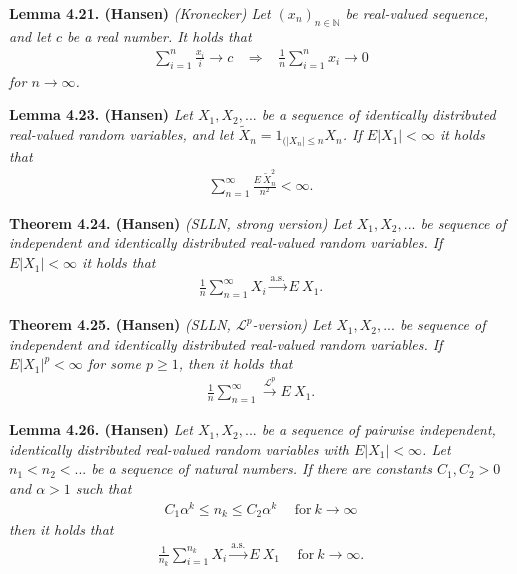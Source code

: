 \documentclass[a4paper,12pt,openany]{book}
\begin{document}
\textbf{Lemma 4.21. (Hansen)} \emph{(Kronecker) Let \((x_n)_{n\in\mathbb{N}}\) be real-valued sequence, and let \(c\) be a real number. It holds that}
\begin{align*}
    \sum_{i=1}^n\frac{x_i}{i}\to c \hspace{10pt}\Rightarrow\hspace{10pt} \frac{1}{n}\sum_{i=1}^nx_i\to 0
\end{align*}
\emph{for \(n\to \infty\).}

\textbf{Lemma 4.23. (Hansen)} \emph{Let \(X_1,X_2,...\) be a sequence of identically distributed real-valued random variables, and let \(\tilde{X}_n=1_{(\vert X_n\vert \le n}X_n\). If \(E\vert X_1\vert<\infty\) it holds that}
\begin{align*}
    \sum_{n=1}^\infty\frac{E\ \tilde{X}_n^2}{n^2}<\infty.
\end{align*}

\textbf{Theorem 4.24. (Hansen)} \emph{(SLLN, strong version) Let \(X_1,X_2,...\) be sequence of independent and identically distributed real-valued random variables. If \(E\vert X_1\vert <\infty\) it holds that}
\begin{align*}
    \frac{1}{n}\sum_{n=1}^\infty X_i\stackrel{\text{a.s.}}{\to} E\ X_1.\tag{4.24}
\end{align*}

\textbf{Theorem 4.25. (Hansen)} \emph{(SLLN, \(\mathcal{L}^p\)-version) Let \(X_1,X_2,...\) be sequence of independent and identically distributed real-valued random variables. If \(E\vert X_1\vert^p <\infty\) for some \(p\ge 1\), then it holds that}
\begin{align*}
\frac{1}{n}\sum_{n=1}^\infty \stackrel{\mathcal{L}^p}{\to} E\ X_1.\tag{4.26}    
\end{align*}

\textbf{Lemma 4.26. (Hansen)} \emph{Let \(X_1,X_2,...\) be a sequence of pairwise independent, identically distributed real-valued random variables with \(E\vert X_1\vert <\infty\). Let \(n_1<n_2<...\) be a sequence of natural numbers. If there are constants \(C_1,C_2>0\) and \(\alpha>1\) such that}
\begin{align*}
    C_1\alpha^k\le n_k\le C_2\alpha^k\hspace{15pt}\text{for}\ k\to\infty\tag{4.27}
\end{align*}
\emph{then it holds that}
\begin{align*}
    \frac{1}{n_k}\sum_{i=1}^{n_k}X_i\stackrel{\text{a.s.}}{\to} E\ X_1\hspace{15pt}\text{for}\ k\to \infty.
\end{align*}
\end{document}
